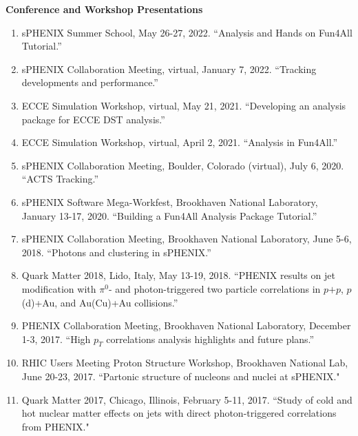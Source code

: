 \documentclass[11pt]{article}
\begin{document}
\vspace{7pt}











\begin{flushleft}
	\LARGE\textbf{Conference and Workshop Presentations} \\
	\normalsize
	\begin{enumerate}
		\item sPHENIX Summer School, May 26-27, 2022. ``Analysis and Hands on Fun4All Tutorial.''
		\item sPHENIX Collaboration Meeting, virtual, January 7, 2022. ``Tracking developments and performance.''
		\item ECCE Simulation Workshop, virtual, May 21, 2021. ``Developing an analysis package for ECCE DST analysis.''
		\item ECCE Simulation Workshop, virtual, April 2, 2021. ``Analysis in Fun4All.''
		\item sPHENIX Collaboration Meeting, Boulder, Colorado (virtual), July 6, 2020. ``ACTS Tracking.''
		\item sPHENIX Software Mega-Workfest, Brookhaven National Laboratory, January 13-17, 2020. ``Building a Fun4All Analysis Package Tutorial.''
		\item sPHENIX Collaboration Meeting, Brookhaven National Laboratory, June 5-6, 2018. ``Photons and clustering in sPHENIX.''
		\item Quark Matter 2018, Lido, Italy, May 13-19, 2018. ``PHENIX results on jet modification with $\pi^0$- and photon-triggered two particle correlations in $p$$+$$p$, $p$(d)+Au, and Au(Cu)+Au collisions.''
		
		\item PHENIX Collaboration Meeting, Brookhaven National Laboratory, December 1-3, 2017. ``High $p_T$ correlations analysis highlights and future plans.''
		
		\item RHIC Users Meeting Proton Structure Workshop, Brookhaven National Lab, June 20-23, 2017. ``Partonic structure of nucleons and nuclei at sPHENIX."
		
		\item Quark Matter 2017, Chicago, Illinois, February 5-11, 2017. ``Study of cold and hot nuclear matter effects on jets with direct photon-triggered correlations from PHENIX."
		

\end{enumerate}
\end{flushleft}
\end{document}
